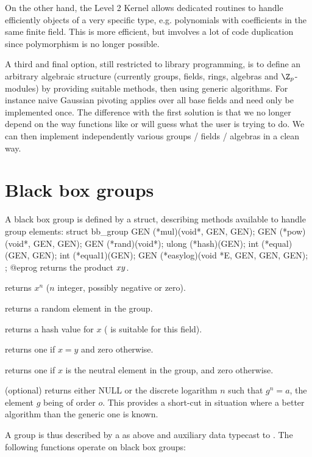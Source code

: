 On the other hand, the Level 2 Kernel allows dedicated routines to handle
efficiently objects of a very specific type, e.g. polynomials with
coefficients in the same finite field. This is more efficient, but imvolves a
lot of code duplication since polymorphism is no longer possible.

A third and final option, still restricted to library programming, is to
define an arbitrary algebraic structure (currently groups, fields, rings,
algebras and $\Z_p$-modules) by providing suitable methods, then using generic
algorithms. For instance naive Gaussian pivoting applies over all base fields
and need only be implemented once. The difference with the first solution
is that we no longer depend on the way functions like  or
 will guess what the user is trying to do. We can then implement
independently various groups / fields / algebras in a clean way.

\section{Black box groups}

A black box group is defined by a  struct, describing methods
available to handle group elements:
\bprog
    struct bb_group
    {
      GEN (*mul)(void*, GEN, GEN);
      GEN (*pow)(void*, GEN, GEN);
      GEN (*rand)(void*);
      ulong (*hash)(GEN);
      int (*equal)(GEN, GEN);
      int (*equal1)(GEN);
      GEN (*easylog)(void *E, GEN, GEN, GEN);
    };
@eprog
 returns the product $x\*y$.

 returns $x^n$ ($n$ integer, possibly negative or zero).

 returns a random element in the group.

 returns a hash value for $x$ ( is suitable for this field).

 returns one if $x=y$ and zero otherwise.

 returns one if $x$ is the neutral element in the group,
and zero otherwise.

 (optional) returns either NULL or the discrete logarithm
$n$ such that $g^n=a$, the element $g$ being of order $o$. This provides a
short-cut in situation where a better algorithm than the generic one is known.

A group is thus described by a  as above and auxiliary
data typecast to . The following functions operate on black box
groups:

